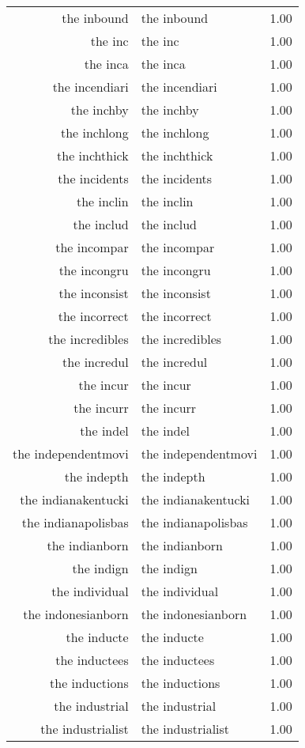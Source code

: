 \begin{table}[ht]
\begin{tabular}{rlr}
  the inbound & the inbound & 1.00 \\ 
  the inc & the inc & 1.00 \\ 
  the inca & the inca & 1.00 \\ 
  the incendiari & the incendiari & 1.00 \\ 
  the inchby & the inchby & 1.00 \\ 
  the inchlong & the inchlong & 1.00 \\ 
  the inchthick & the inchthick & 1.00 \\ 
  the incidents & the incidents & 1.00 \\ 
  the inclin & the inclin & 1.00 \\ 
  the includ & the includ & 1.00 \\ 
  the incompar & the incompar & 1.00 \\ 
  the incongru & the incongru & 1.00 \\ 
  the inconsist & the inconsist & 1.00 \\ 
  the incorrect & the incorrect & 1.00 \\ 
  the incredibles & the incredibles & 1.00 \\ 
  the incredul & the incredul & 1.00 \\ 
  the incur & the incur & 1.00 \\ 
  the incurr & the incurr & 1.00 \\ 
  the indel & the indel & 1.00 \\ 
  the independentmovi & the independentmovi & 1.00 \\ 
  the indepth & the indepth & 1.00 \\ 
  the indianakentucki & the indianakentucki & 1.00 \\ 
  the indianapolisbas & the indianapolisbas & 1.00 \\ 
  the indianborn & the indianborn & 1.00 \\ 
  the indign & the indign & 1.00 \\ 
  the individual & the individual & 1.00 \\ 
  the indonesianborn & the indonesianborn & 1.00 \\ 
  the inducte & the inducte & 1.00 \\ 
  the inductees & the inductees & 1.00 \\ 
  the inductions & the inductions & 1.00 \\ 
  the industrial & the industrial & 1.00 \\ 
  the industrialist & the industrialist & 1.00 \\ 

\end{tabular}
\end{table}
